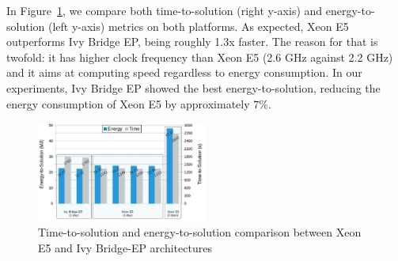 In Figure~\ref{fig:3}, we compare both time-to-solution (right y-axis)
and  energy-to-solution (left  y-axis) metrics  on both  platforms. As
expected,  Xeon  E5 outperforms  Ivy  Bridge  EP,  being roughly  1.3x
faster.  The reason for that is twofold: it has higher clock frequency
than Xeon E5 (2.6 GHz against  2.2 GHz) and it aims at computing speed
regardless to  energy consumption. In  our experiments, Ivy  Bridge EP
showed the best energy-to-solution, reducing the energy consumption of
Xeon E5 by approximately $7\%$.

\begin{figure}[htbf]
  \includegraphics[width=0.5\textwidth]{Figs/Time_E2S_COSMO-ART.eps}
  \caption{Time-to-solution and  energy-to-solution comparison between
    Xeon E5 and Ivy Bridge-EP architectures}
  \label{fig:3}
\end{figure}

